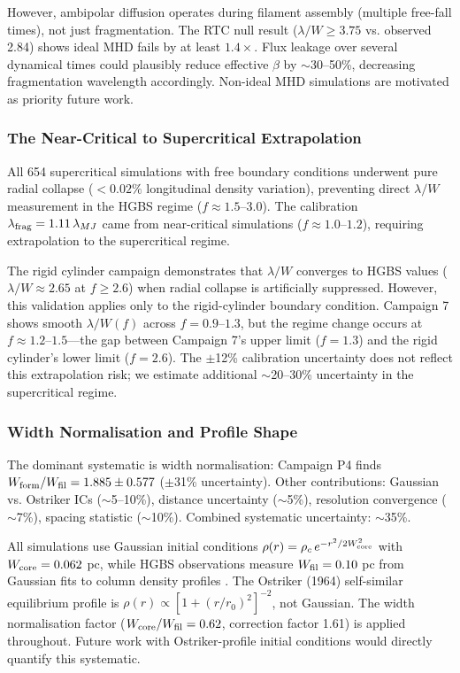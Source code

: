 \documentclass[twocolumn,longtitle,usenatbib]{mnras}
\begin{document}
However, ambipolar diffusion operates during filament assembly (multiple free-fall times), not just fragmentation. The RTC null result ($\lambda/W \geq 3.75$ vs. observed 2.84) shows ideal MHD fails by at least $1.4\times$. Flux leakage over several dynamical times could plausibly reduce effective $\beta$ by $\sim$30--50\%, decreasing fragmentation wavelength accordingly. Non-ideal MHD simulations are motivated as priority future work.

\subsubsection{The Near-Critical to Supercritical Extrapolation}
\label{sec:extrapolation_problem}

All 654 supercritical simulations with free boundary conditions underwent pure radial collapse ($<0.02\%$ longitudinal density variation), preventing direct $\lambda/W$ measurement in the HGBS regime ($f \approx 1.5$--$3.0$). The calibration $\lambda_{\rm frag} = 1.11\,\lambda_{MJ}$ came from near-critical simulations ($f \approx 1.0$--$1.2$), requiring extrapolation to the supercritical regime.

The rigid cylinder campaign demonstrates that $\lambda/W$ converges to HGBS values ($\lambda/W \approx 2.65$ at $f \geq 2.6$) when radial collapse is artificially suppressed. However, this validation applies only to the rigid-cylinder boundary condition. Campaign 7 shows smooth $\lambda/W(f)$ across $f = 0.9$--$1.3$, but the regime change occurs at $f \approx 1.2$--$1.5$---the gap between Campaign 7's upper limit ($f = 1.3$) and the rigid cylinder's lower limit ($f = 2.6$). The $\pm$12\% calibration uncertainty does not reflect this extrapolation risk; we estimate additional $\sim$20--30\% uncertainty in the supercritical regime.

\subsubsection{Width Normalisation and Profile Shape}

The dominant systematic is width normalisation: Campaign P4 finds $W_{\rm form}/W_{\rm fil} = 1.885 \pm 0.577$ ($\pm$31\% uncertainty). Other contributions: Gaussian vs. Ostriker ICs ($\sim$5--10\%), distance uncertainty ($\sim$5\%), resolution convergence ($\sim$7\%), spacing statistic ($\sim$10\%). Combined systematic uncertainty: $\sim$35\%.

All simulations use Gaussian initial conditions $\rho(r) = \rho_c\,e^{-r^2/2W_{\rm core}^2}$ with $W_{\rm core} = 0.062$ pc, while HGBS observations measure $W_{\rm fil} = 0.10$ pc from Gaussian fits to column density profiles \citep{Arzoumanian2011}. The Ostriker (1964) self-similar equilibrium profile is $\rho(r) \propto [1 + (r/r_0)^2]^{-2}$, not Gaussian. The width normalisation factor ($W_{\rm core}/W_{\rm fil} = 0.62$, correction factor 1.61) is applied throughout. Future work with Ostriker-profile initial conditions would directly quantify this systematic.
\end{document}
